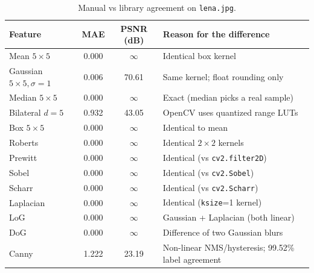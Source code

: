 \documentclass[a4paper,11pt]{article}
\begin{document}
\begin{table}[H]
\centering
\caption{Manual vs library agreement on \texttt{lena.jpg}.}
\label{tab:metrics}
\begin{tabular}{l c c p{5.8cm}}
\toprule
\textbf{Feature} & \textbf{MAE} & \textbf{PSNR (dB)} & \textbf{Reason for the difference} \\
\midrule
Mean $5\times5$              & 0.000 & $\infty$ & Identical box kernel \\
Gaussian $5\times5,\sigma{=}1$ & 0.006 & 70.61 & Same kernel; float rounding only \\
Median $5\times5$            & 0.000 & $\infty$ & Exact (median picks a real sample) \\
Bilateral $d{=}5$            & 0.932 & 43.05 & OpenCV uses quantized range LUTs \\
Box $5\times5$               & 0.000 & $\infty$ & Identical to mean \\
Roberts                      & 0.000 & $\infty$ & Identical $2\times2$ kernels \\
Prewitt                      & 0.000 & $\infty$ & Identical (vs \texttt{cv2.filter2D}) \\
Sobel                        & 0.000 & $\infty$ & Identical (vs \texttt{cv2.Sobel}) \\
Scharr                       & 0.000 & $\infty$ & Identical (vs \texttt{cv2.Scharr}) \\
Laplacian                    & 0.000 & $\infty$ & Identical (\texttt{ksize}=1 kernel) \\
LoG                          & 0.000 & $\infty$ & Gaussian + Laplacian (both linear) \\
DoG                          & 0.000 & $\infty$ & Difference of two Gaussian blurs \\
Canny                        & 1.222 & 23.19 & Non-linear NMS/hysteresis; 99.52\% label agreement \\
\bottomrule
\end{tabular}
\end{table}
\end{document}
